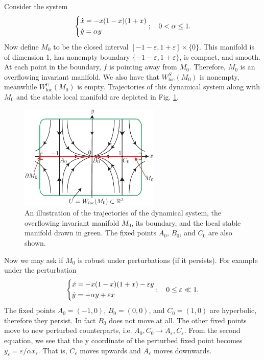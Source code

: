 \begin{ex}[]
	Consider the system
	\begin{align}
		\begin{dcases}
			\dot{x}= -x(1-x)(1+x) \\
			\dot{y} = \alpha y
		\end{dcases}
		;\quad 0 < \alpha \leq 1.
	\end{align}
	Now define $M_0$ to be the closed interval $[-1-\varepsilon, 1 + \varepsilon]\times \{0\}$. This manifold is of dimension 1, has nonempty boundary $\{-1-\varepsilon, 1+\varepsilon\}$, is compact, and smooth. At each point in the boundary, $f$ is pointing away from $M_0$. Therefore, $M_0$ is an overflowing invariant manifold. We also have that $W^{S}_{ \textrm{loc}}(M_0)$ is nonempty, meanwhile $W^{U}_{ \textrm{loc} }(M_0)$ is empty. Trajectories of this dynamical system along with $M_0$ and the stable local manifold are depicted in Fig. \ref{fig:overflowing_mfd_ex1}.
	\begin{figure}[h!]
		\centering
		\includegraphics[width=0.6\textwidth]{figures/ch9/11overflowing_mfd_ex1.pdf}
		\caption{An illustration of the trajectories of the dynamical system, the overflowing invariant manifold $M_0$, its boundary, and the local stable manifold drawn in green. The fixed points $A_0$, $B_0$, and $C_0$ are also shown.}
		\label{fig:overflowing_mfd_ex1}
	\end{figure}

	Now we may ask if $M_0$ is robust under perturbations (if it persists). For example under the perturbation
	\begin{align}
		\begin{dcases}
			\dot{x} = -x(1-x)(1+x) -\varepsilon y \\
			\dot{y} = - \alpha y + \varepsilon x
		\end{dcases}
		;\quad 0 \leq \varepsilon \ll 1.
	\end{align}
	The fixed points $A_0=(-1,0)$, $B_0=(0,0)$, and $C_0=(1,0)$ are hyperbolic, therefore they persist. In fact $B_0$ does not move at all. The other fixed points move to new perturbed counterparts, i.e. $A_0,C_0 \to A_{\varepsilon}, C_{\varepsilon}$. From the second equation, we see that the y coordinate of the perturbed fixed point becomes $y_\varepsilon= \varepsilon/\alpha x_\varepsilon$. That is, $C_\varepsilon$ moves upwards and $A_\varepsilon$ moves downwards.


\end{ex}
